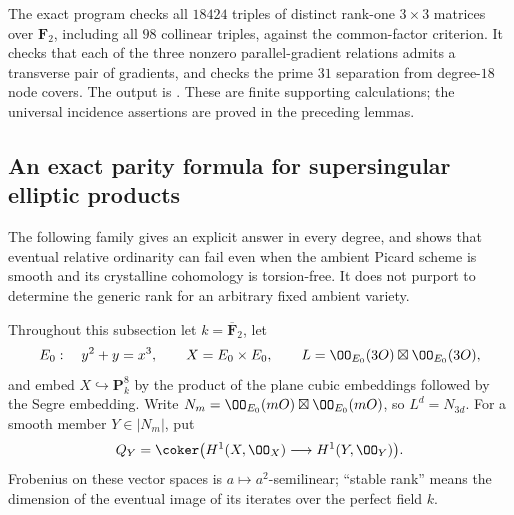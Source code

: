 \begin{remark}\label{auto:A_monodromy:3a04f9cdd890}

The exact program
checks all $18424$ triples of distinct rank-one $3\times3$
matrices over $\mathbf F_2$, including all $98$ collinear
triples, against the common-factor criterion. It checks that
each of the three nonzero parallel-gradient relations admits
a transverse pair of gradients, and checks the prime $31$
separation from degree-$18$ node covers. The output is
.
These are finite supporting calculations; the universal
incidence assertions are proved in the preceding lemmas.
\end{remark}


\subsection{An exact parity formula for supersingular elliptic products}
\label{sec:DE-A3-ss-product}

The following family gives an explicit answer in every degree, and shows that
eventual relative ordinarity can fail even when the ambient Picard scheme is
smooth and its crystalline cohomology is torsion-free.  It does not purport to
determine the generic rank for an arbitrary fixed ambient variety.

Throughout this subsection let $k=\overline{\mathbf F}_2$, let
\[
 E_0:\quad y^2+y=x^3,
 \qquad X=E_0\times E_0,
 \qquad L=\OO_{E_0}(3O)\boxtimes\OO_{E_0}(3O),
\]
and embed $X\hookrightarrow\mathbf P^8_k$ by the product of the plane cubic
embeddings followed by the Segre embedding.  Write
$N_m=\OO_{E_0}(mO)\boxtimes\OO_{E_0}(mO)$, so $L^d=N_{3d}$.
For a smooth member $Y\in|N_m|$, put
\[
 Q_Y=\coker\bigl(H^1(X,\OO_X)\longrightarrow H^1(Y,\OO_Y)\bigr).
\]
Frobenius on these vector spaces is $a\mapsto a^2$-semilinear; ``stable rank''
means the dimension of the eventual image of its iterates over the perfect
field $k$.

